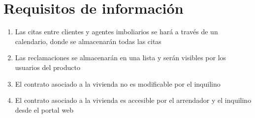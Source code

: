 \section{Requisitos de información}
\begin{enumerate}
\item Las citas entre clientes y agentes imboliarios se hará a través de un calendario, donde se almacenarán todas las citas
\item Las reclamaciones se almacenarán en una lista y serán visibles por los usuarios del producto
\item El contrato asociado a la vivienda no es modificable por el inquilino
\item El contrato asociado a la vivienda es accesible por el arrendador y el inquilino desde el portal web
\end{enumerate}
